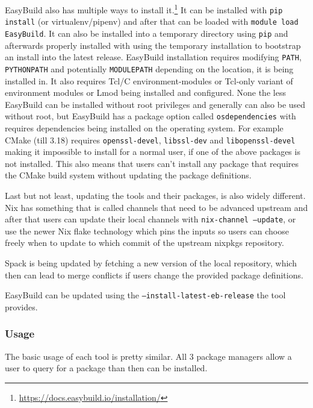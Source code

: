 \documentclass[conference,final,a4paper]{IEEEtran}
\begin{document}
EasyBuild also has multiple ways to install it.\footnote{\url{https://docs.easybuild.io/installation/}}
It can be installed with \texttt{pip install} (or virtualenv/pipenv) and after that can be loaded with \texttt{module load EasyBuild}.
It can also be installed into a temporary directory using \texttt{pip} and afterwards properly installed with using the temporary installation to bootstrap an install into the latest release.
EasyBuild installation requires modifying \texttt{PATH}, \texttt{PYTHONPATH} and potentially \texttt{MODULEPATH} depending on the location, it is being installed in.
It also requires Tcl/C environment-modules or Tcl-only variant of environment modules or Lmod being installed and configured.
None the less EasyBuild can be installed without root privileges and generally can also be used without root, but EasyBuild has a package option called \texttt{osdependencies} with requires dependencies being installed on the operating system.
For example CMake (till 3.18) requires \texttt{openssl-devel}, \texttt{libssl-dev} and \texttt{libopenssl-devel} making it impossible to install for a normal user, if one of the above packages is not installed.
This also means that users can't install any package that requires the CMake build system without updating the package definitions.

Last but not least, updating the tools and their packages, is also widely different.
Nix has something that is called channels that need to be advanced upstream and after that users can update their local channels with \texttt{nix-channel --update}, or use the newer Nix flake technology which pins the inputs so users can choose freely when to update to which commit of the upstream nixpkgs repository.

Spack is being updated by fetching a new version of the local repository, which then can lead to merge conflicts if users change the provided package definitions.

EasyBuild can be updated using the \texttt{--install-latest-eb-release} the tool provides.\\

\subsubsection{Usage}

The basic usage of each tool is pretty similar.
All 3 package managers allow a user to query for a package than then can be installed.
\end{document}
